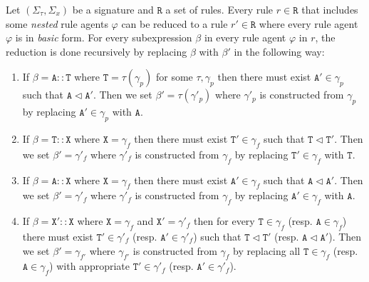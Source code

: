 \documentclass{entcs}
\renewcommand{\~}[0]{\texttildelow}
\begin{document}
\begin{definition}
Let $(\Sigma_\tau,\Sigma_x)$ be a signature and $\mathtt{R}$ a set of rules. Every rule $r\in\mathtt{R}$ that includes some \emph{nested} rule agents $\varphi$ can be reduced to a rule $r'\in\mathtt{R}$ where every rule agent $\varphi$ is in \emph{basic} form. For every subexpression $\beta$ in every rule agent $\varphi$ in $r$, the reduction is done recursively by replacing $\beta$ with $\beta'$ in the following way:
\begin{enumerate}
\item If $\beta=\mathtt{A}::\mathtt{T}$ where $\mathtt{T}=\tau(\gamma_p)$ for some $\tau,\gamma_p$ then there must exist $\mathtt{A}'\in\gamma_p$ such that $\mathtt{A}\lhd\mathtt{A}'$. Then we set $\beta'={\tau}(\gamma'_p)$ where $\gamma'_p$ is constructed from $\gamma_p$ by replacing $\mathtt{A}'\in\gamma_p$ with $\mathtt{A}$.
\item If $\beta=\mathtt{T}::\mathtt{X}$ where $\mathtt{X}=\gamma_f$ then there must exist $\mathtt{T}'\in\gamma_f$ such that $\mathtt{T}\lhd\mathtt{T}'$. Then we set $\beta'=\gamma'_f$ where $\gamma'_f$ is constructed from $\gamma_f$ by replacing $\mathtt{T}'\in\gamma_f$ with $\mathtt{T}$. 
\item If $\beta=\mathtt{A}::\mathtt{X}$ where $\mathtt{X}=\gamma_f$ then there must exist $\mathtt{A}'\in\gamma_f$ such that $\mathtt{A}\lhd\mathtt{A}'$. Then we set $\beta'=\gamma'_f$ where $\gamma'_f$ is constructed from $\gamma_f$ by replacing $\mathtt{A}'\in\gamma_f$ with $\mathtt{A}$. 
\item If $\beta=\mathtt{X}'::\mathtt{X}$ where $\mathtt{X}=\gamma_f$ and $\mathtt{X}'= \gamma'_f$ then for every $\mathtt{T} \in \gamma_f$ (resp. $\mathtt{A} \in \gamma_f$) there must exist $\mathtt{T}' \in \gamma'_f$ (resp. $\mathtt{A}' \in \gamma'_f$) such that $\mathtt{T} \lhd \mathtt{T}'$ (resp. $\mathtt{A} \lhd \mathtt{A}'$). Then we set $\beta'=\gamma_{f'}$ where $\gamma_{f'}$ is constructed from $\gamma_f$ by replacing all $\mathtt{T} \in \gamma_f$ (resp. $\mathtt{A} \in \gamma_f$) with appropriate $\mathtt{T}' \in \gamma'_f$  (resp. $\mathtt{A}' \in \gamma'_f$).
\end{enumerate} 
\end{definition}
\end{document}
